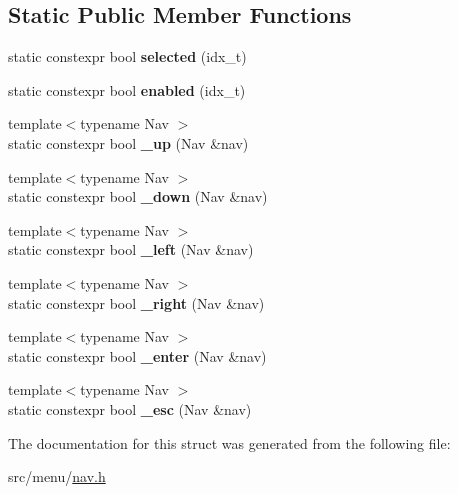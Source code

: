 \subsection*{Static Public Member Functions}
\begin{DoxyCompactItemize}
\item 
\mbox{\label{structDrift_a9737d0d991f1dba95915858aa43ca356}} 
static constexpr bool {\bfseries selected} (idx\+\_\+t)
\item 
\mbox{\label{structDrift_ad8fd05fa63905edfe08d9ab678d8dfd3}} 
static constexpr bool {\bfseries enabled} (idx\+\_\+t)
\item 
\mbox{\label{structDrift_abf8c955aef771abbc8e4496998403d3f}} 
{\footnotesize template$<$typename Nav $>$ }\\static constexpr bool {\bfseries \+\_\+up} (Nav \&nav)
\item 
\mbox{\label{structDrift_a99f89a368f6fb5f5a20cc38ed5894553}} 
{\footnotesize template$<$typename Nav $>$ }\\static constexpr bool {\bfseries \+\_\+down} (Nav \&nav)
\item 
\mbox{\label{structDrift_ad57b88b6f6900dc584dc8d7f71f50cda}} 
{\footnotesize template$<$typename Nav $>$ }\\static constexpr bool {\bfseries \+\_\+left} (Nav \&nav)
\item 
\mbox{\label{structDrift_aa39175b77012010c272db3fba6d635ea}} 
{\footnotesize template$<$typename Nav $>$ }\\static constexpr bool {\bfseries \+\_\+right} (Nav \&nav)
\item 
\mbox{\label{structDrift_a399e70655ae78a3abba826ebcc36f363}} 
{\footnotesize template$<$typename Nav $>$ }\\static constexpr bool {\bfseries \+\_\+enter} (Nav \&nav)
\item 
\mbox{\label{structDrift_a444d8426671cd25610c2a79799295353}} 
{\footnotesize template$<$typename Nav $>$ }\\static constexpr bool {\bfseries \+\_\+esc} (Nav \&nav)
\end{DoxyCompactItemize}


The documentation for this struct was generated from the following file\+:\begin{DoxyCompactItemize}
\item 
src/menu/\hyperlink{nav_8h}{nav.\+h}\end{DoxyCompactItemize}
